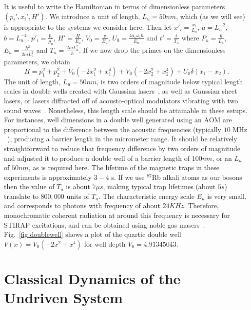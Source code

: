 \documentclass{article}
\begin{document}
It is useful to write the Hamiltonian in terms of dimensionless parameters $(p_i', x_i',H')$. We  introduce a unit of length, $L_u=50 nm$, which (as we will see) is appropriate to the systems we consider here.  Then let  $x'_i=\frac{x_i}{L_u}$, $a=L_u^{-2}$, $b=L_u^{-4}$, $p'_i=\frac{p_i}{p_u}$, $H'=\frac{H}{E_u}$,  $V_0=\frac{v}{E_u}$, $U_0=\frac{4a_s \omega_s \hbar}{E_u}$ and $t'=\frac{t}{T_u}$ where $P_u=\frac{\hbar}{L_u}$, $E_u=\frac{\hbar^2}{2mL^2_u}$ and $T_u=\frac{2mL^2_u}{\hbar}$. If we now drop the primes on the dimensionless parameters, we obtain
%
\begin{equation}
H =p^2_1+p^2_2+V_0 (-2 x_1^2+ x_1^4) +V_0 (-2 x_2^2+ x_2^4)+U_0 \delta(x_1-x_2) .
\label{eq:hamscale}
\end{equation}
%
The unit of length, $L_u = 50 nm$, is two orders of magnitude below typical length scales in double wells created with  Gaussian lasers~\cite{dudarev:entanglement}, as well as Gaussian sheet lasers, or  lasers diffracted off of acousto-optical modulators vibrating with two sound waves~\cite{ketterle:aom}. Nonetheless, this length scale should be attainable in these setups. For instances, well dimensions in a double well generated using an AOM are proportional to the difference between the acoustic frequencies (typically $10$ MHz ~\cite{ketterle:aom}), producing a barrier length in the micrometer range. It should be relatively straightforward to reduce that frequency difference by two orders of magnitude and adjusted it to produce a double well of a barrier length of $100 nm$, or an $L_u$ of $50 nm$, as is required here. The lifetime of the magnetic traps in these experiments is approximately $3-4$ s. If we use $^{87}$Rb alkali atoms as our bosons then the value of $T_u$ is about $7 \mu s$, making typical trap lifetimes (about $5 s$) translate to $800,000$ units of $T_u$. The characteristic energy scale $E_u$ is very small, and corresponds to photons with frequency of about $24 KHz$. Therefore,  monochromatic coherent radiation at around this frequency is necessary for STIRAP excitations, and can be obtained using noble gas masers~\cite{maser}.   Fig.~\ref{fig:doublewell} shows a plot of the quartic double well $V(x)=V_0 (-2 x^2+ x^4)$ for  well depth $V_0=4.91345043$.

%
%
\section{\label{sec:3} Classical Dynamics of the Undriven System}
%
%
\end{document}
